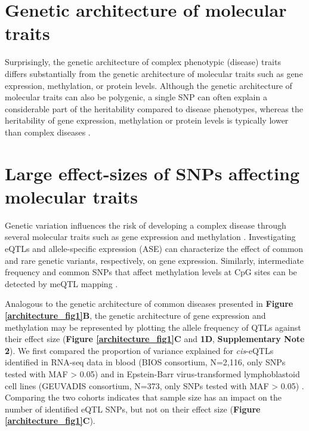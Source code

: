 \section{Genetic architecture of molecular traits}
Surprisingly, the genetic architecture of complex phenotypic (disease) traits differs substantially from the genetic architecture of molecular traits such as gene expression, methylation, or protein levels. Although the genetic architecture of molecular traits can also be polygenic, a single SNP can often explain a considerable part of the heritability compared to disease phenotypes, whereas the heritability of gene expression, methylation or protein levels is typically lower than complex diseases \cite{wrightHeritabilityGenomicsGene2014,poldermanMetaanalysisHeritabilityHuman2015}. 

\section{Large effect-sizes of SNPs affecting molecular traits}
Genetic variation influences the risk of developing a complex disease through several molecular traits such as gene expression \cite{emilssonGeneticsGeneExpression2008} and methylation \cite{conerlyInsightsRoleDNA2010}. Investigating eQTLs \cite{pickrellUnderstandingMechanismsUnderlying2010,lappalainenTranscriptomeGenomeSequencing2013,westraSystematicIdentificationTrans2013,zhernakovaIdentificationContextdependentExpression2017,gibsonExpressionQuantitativeTrait2015} and allele-specific expression (ASE) \cite{deelenCallingGenotypesPublic2015,pirinenAssessingAllelespecificExpression2015,rivasEffectPredictedProteintruncating2015,castelToolsBestPractices2015} can characterize the effect of common and rare genetic variants, respectively, on gene expression. Similarly, intermediate frequency and common SNPs that affect methylation levels at CpG sites can be detected by meQTL mapping \cite{bonderDiseaseVariantsAlter2017}.

Analogous to the genetic architecture of common diseases presented in \textbf{Figure \ref{architecture_fig1}B}, the genetic architecture of gene expression and methylation may be represented by plotting the allele frequency of QTLs against their effect size (\textbf{Figure \ref{architecture_fig1}C} and \textbf{1D}, \textbf{Supplementary Note 2}). We first compared the proportion of variance explained for \emph{cis}-eQTLs identified in RNA-seq data in blood (BIOS consortium, N=2,116, only SNPs tested with MAF > 0.05) \cite{zhernakovaIdentificationContextdependentExpression2017} and in Epstein-Barr virus-transformed lymphoblastoid cell lines (GEUVADIS consortium, N=373, only SNPs tested with MAF > 0.05) \cite{lappalainenTranscriptomeGenomeSequencing2013}. Comparing the two cohorts indicates that sample size has an impact on the number of identified eQTL SNPs, but not on their effect size (\textbf{Figure \ref{architecture_fig1}C}). 


